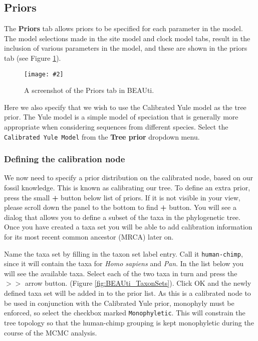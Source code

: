 \documentclass[12pt]{article}
\newcommand{\includeimage}[2][]{%
\texttt{[image: \#2]}
}
\begin{document}
\subsection{Priors }

The {\bf Priors} tab allows priors to be specified for each parameter in the
model. The model selections made in the site model and clock model tabs, result in the inclusion of various parameters
in the model, and these are shown in the priors tab (see Figure \ref{fig:BEAUti_Prior1}).

\begin{figure}
\centering
\includeimage[width=\textwidth]{figures/BEAUti_Prior1}
\caption{A screenshot of the Priors tab in BEAUti. }
\label{fig:BEAUti_Prior1}
\end{figure}

Here we also specify that we wish to use the Calibrated Yule model \cite{Heled:2012fk}
as the tree prior. The Yule model is a simple model of
speciation that is generally more appropriate when considering sequences from
different species. %
Select the \texttt{Calibrated Yule Model} from the {\bf Tree prior} dropdown menu.


\subsubsection{Defining the calibration node}

We now need to specify a prior distribution on the calibrated node, based on our
fossil knowledge. This is known as calibrating our tree. To define an extra prior, press the small {\bf +} button below list of priors. If it is not visible in your view, please scroll down the panel to the bottom to find {\bf +} button. 
You will see a dialog that allows you to define a subset of the taxa in the phylogenetic tree. Once you have created a taxa set you will be able to add calibration information for its most recent common
ancestor (MRCA) later on. 

Name the taxa set by filling in the taxon set label entry. 
Call it \texttt{human-chimp}, since it will contain the taxa for {\it Homo sapiens} and {\it Pan}. 
In the list below you will see the available taxa. Select each of the two taxa in turn and press the $> >$ arrow button. (Figure \ref{fig:BEAUti_TaxonSets}).
Click OK and the newly defined taxa set will be added in to the prior list.
As this is a calibrated node to be used in conjunction with the Calibrated Yule prior, monophyly must be enforced, so select the checkbox marked \texttt{Monophyletic}. This will constrain the tree topology so that the human-chimp grouping is kept monophyletic during the course of the MCMC analysis.
\end{document}
